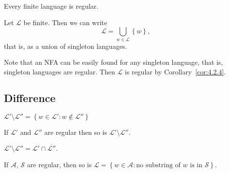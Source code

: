 \documentclass{notes}
\begin{document}
\begin{cor}
  Every finite language is regular.
\end{cor}

\begin{prf}
  Let $\mathcal L$ be finite.
  Then we can write 
  \[
    \mathcal L = \bigcup_{w \in \mathcal L} \left \{ w \right \}, 
  \]
  that is, as a union of singleton languages.

  Note that an NFA can be easily found for any singleton language, that is, singleton languages are regular.
  Then $\mathcal L$ is regular by Corollary~\ref{cor:4.2.4}.
\end{prf}

\newpage

\subsection{Difference}

\begin{center}
  $\mathcal L' \setminus \mathcal L'' = \left \{ w \in \mathcal L' : w \not \in \mathcal L'' \right \}$
\end{center}

\begin{center}
\end{center}

\begin{thm}
  If $\mathcal L'$ and $\mathcal L''$ are regular then so is $\mathcal L' \setminus \mathcal L''$.
\end{thm}

\begin{prf}
  $\mathcal L' \setminus \mathcal L'' = \mathcal L' \cap \overline{\mathcal L''}$.
\end{prf}

\begin{cor}
  If $\mathcal A$, $\mathcal S$ are regular, then so is $\mathcal L = \left \{ w \in \mathcal A : \text{no substring of $w$ is in $\mathcal S$} \right \}$.
\end{cor}
\end{document}
